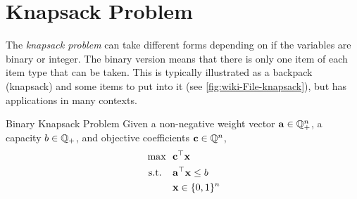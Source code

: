 \section{Knapsack Problem}
The \emph{knapsack problem} can take different forms depending on if the variables are binary or integer.  The binary version means that there is only one item of each item type that can be taken.  This is typically illustrated as a backpack (knapsack) and some items to put into it (see  \autoref{fig:wiki-File-knapsack}), but has applications in many contexts.  




\begin{general}{Binary Knapsack Problem}{\npcomplete}
Given a non-negative weight vector $\mathbf{a} \in \mathbb{Q}^n_+$, a capacity $b \in \mathbb{Q}_+$, and objective coefficients $\mathbf{c} \in \mathbb{Q}^n$, 
\begin{equation}
\begin{split}
\max \ \ & \mathbf{c}^\top \mathbf{x}\\
\mbox{ s.t. } \ \ & \mathbf{a}^\top \mathbf{x} \leq b\\
& \mathbf{x} \in \{0,1\}^n
\end{split}
\end{equation}
\end{general}
 


 

